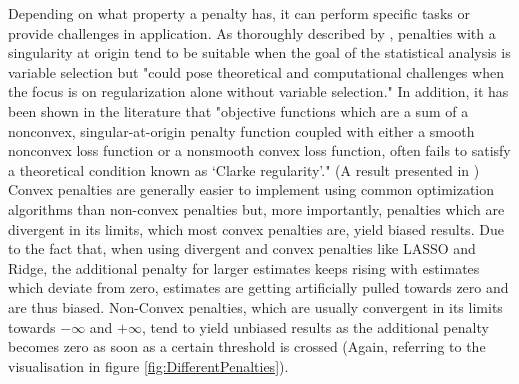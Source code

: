 \documentclass[12pt,a4paper]{article}
\begin{document}
Depending on what property a penalty has, it can perform specific tasks or provide challenges in application. As thoroughly described by \parencite{JohnVettamWu2022}, penalties with a singularity at origin tend to be suitable when the goal of the statistical analysis is variable selection but "could pose theoretical and computational challenges when the focus is on regularization alone without variable selection." In addition, it has been shown in the literature that "objective functions which are a sum of a nonconvex, singular-at-origin penalty function coupled with either a smooth nonconvex loss function or a nonsmooth convex loss function, often fails to satisfy a theoretical condition known as ‘Clarke regularity’." (A result presented in \textcite{QiCuiLiuPang2021}) 
Convex penalties are generally easier to implement using common optimization algorithms than non-convex penalties but, more importantly, penalties which are divergent in its limits, which most convex penalties are, yield biased results. Due to the fact that, when using divergent and convex penalties like LASSO and Ridge, the additional penalty for larger estimates keeps rising with estimates which deviate from zero, estimates are getting artificially pulled towards zero and are thus biased. Non-Convex penalties, which are usually convergent in its limits towards $-\infty$ and $+\infty$, tend to yield unbiased results as the additional penalty becomes zero as soon as a certain threshold is crossed (Again, referring to the visualisation in figure \ref{fig:DifferentPenalties}).   
\end{document}

